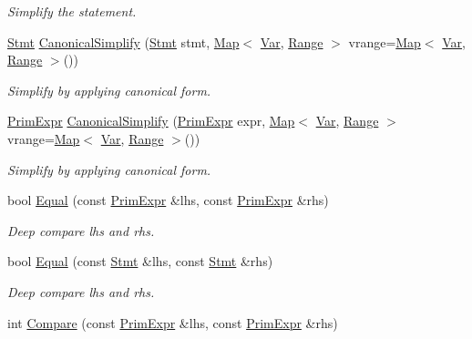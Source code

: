 \begin{DoxyCompactItemize}
\begin{DoxyCompactList}\small\item\em Simplify the statement. \end{DoxyCompactList}\item 
\hyperlink{classtvm_1_1tir_1_1Stmt}{Stmt} \hyperlink{namespacetvm_1_1tir_ae3f7ea11fa82b0cb4a990f51beaa5203}{Canonical\+Simplify} (\hyperlink{classtvm_1_1tir_1_1Stmt}{Stmt} stmt, \hyperlink{classtvm_1_1Map}{Map}$<$ \hyperlink{classtvm_1_1tir_1_1Var}{Var}, \hyperlink{classtvm_1_1Range}{Range} $>$ vrange=\hyperlink{classtvm_1_1Map}{Map}$<$ \hyperlink{classtvm_1_1tir_1_1Var}{Var}, \hyperlink{classtvm_1_1Range}{Range} $>$())
\begin{DoxyCompactList}\small\item\em Simplify by applying canonical form. \end{DoxyCompactList}\item 
\hyperlink{classtvm_1_1PrimExpr}{Prim\+Expr} \hyperlink{namespacetvm_1_1tir_a6a22160396635ce8b681f3aaed32df5b}{Canonical\+Simplify} (\hyperlink{classtvm_1_1PrimExpr}{Prim\+Expr} expr, \hyperlink{classtvm_1_1Map}{Map}$<$ \hyperlink{classtvm_1_1tir_1_1Var}{Var}, \hyperlink{classtvm_1_1Range}{Range} $>$ vrange=\hyperlink{classtvm_1_1Map}{Map}$<$ \hyperlink{classtvm_1_1tir_1_1Var}{Var}, \hyperlink{classtvm_1_1Range}{Range} $>$())
\begin{DoxyCompactList}\small\item\em Simplify by applying canonical form. \end{DoxyCompactList}\item 
bool \hyperlink{namespacetvm_1_1tir_ae9b75fe00e0f29e2cc8e2b3ffe541ff4}{Equal} (const \hyperlink{classtvm_1_1PrimExpr}{Prim\+Expr} \&lhs, const \hyperlink{classtvm_1_1PrimExpr}{Prim\+Expr} \&rhs)
\begin{DoxyCompactList}\small\item\em Deep compare lhs and rhs. \end{DoxyCompactList}\item 
bool \hyperlink{namespacetvm_1_1tir_af7135e786c567aacc96fa95bac4dae4b}{Equal} (const \hyperlink{classtvm_1_1tir_1_1Stmt}{Stmt} \&lhs, const \hyperlink{classtvm_1_1tir_1_1Stmt}{Stmt} \&rhs)
\begin{DoxyCompactList}\small\item\em Deep compare lhs and rhs. \end{DoxyCompactList}\item 
int \hyperlink{namespacetvm_1_1tir_a388b768f462e6699d061b5ea3ca87616}{Compare} (const \hyperlink{classtvm_1_1PrimExpr}{Prim\+Expr} \&lhs, const \hyperlink{classtvm_1_1PrimExpr}{Prim\+Expr} \&rhs)

\end{DoxyCompactItemize}
